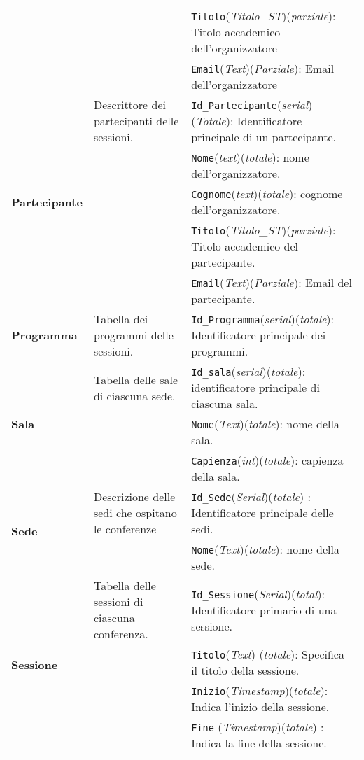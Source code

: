\begin{longtable}{|p{}|p{}|p{}|}
	& & \texttt{Titolo}(\textit{Titolo\_ST})(\textit{parziale}): Titolo accademico dell'organizzatore \\
	& & \texttt{Email}(\textit{Text})(\textit{Parziale}): Email dell'organizzatore \\
	\hline
	\multirow{5}{*}{\textbf{Partecipante}} & Descrittore dei partecipanti delle sessioni. & \texttt{Id\_Partecipante}(\textit{serial})(\textit{Totale}): Identificatore principale di un partecipante. \\
	& & \texttt{Nome}(\textit{text})(\textit{totale}): nome dell'organizzatore. \\
	& & \texttt{Cognome}(\textit{text})(\textit{totale}): cognome dell'organizzatore. \\
	& & \texttt{Titolo}(\textit{Titolo\_ST})(\textit{parziale}): Titolo accademico del partecipante. \\
	& & \texttt{Email}(\textit{Text})(\textit{Parziale}): Email del partecipante. \\
	\hline
	\textbf{Programma} & Tabella dei programmi delle sessioni. & \texttt{Id\_Programma}(\textit{serial})(\textit{totale}): Identificatore principale dei programmi. \\
	\hline
	\multirow{3}{*}{\textbf{Sala}} & Tabella delle sale di ciascuna sede. & \texttt{Id\_sala}(\textit{serial})(\textit{totale}): identificatore principale di ciascuna sala. \\
	& & \texttt{Nome}(\textit{Text})(\textit{totale}): nome della sala. \\
	& & \texttt{Capienza}(\textit{int})(\textit{totale}): capienza della sala.\\
	\hline
	\multirow{2}{*}{\textbf{Sede}} & Descrizione delle sedi che ospitano le conferenze & \texttt{Id\_Sede}(\textit{Serial})(\textit{totale}) : Identificatore principale delle sedi. \\
	& & \texttt{Nome}(\textit{Text})(\textit{totale}): nome della sede. \\
	\hline
	\multirow{4}{*}{\textbf{Sessione}} & Tabella delle sessioni di ciascuna conferenza. & \texttt{Id\_Sessione}(\textit{Serial})(\textit{total}): Identificatore primario di una sessione. \\
	& & \texttt{Titolo}(\textit{Text}) (\textit{totale}): Specifica il titolo della sessione. \\
	& & \texttt{Inizio}(\textit{Timestamp})(\textit{totale}): Indica l'inizio della sessione. \\
	& & \texttt{Fine} (\textit{Timestamp})(\textit{totale}) : Indica la fine della sessione. \\

\end{longtable}
